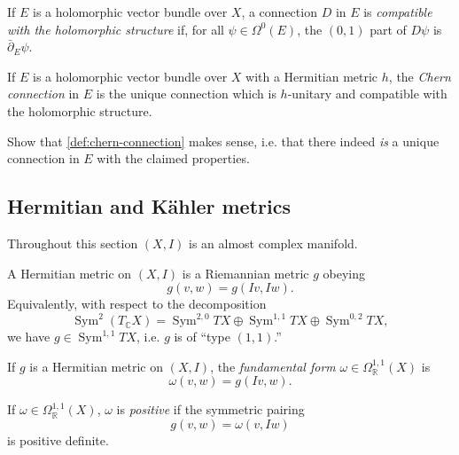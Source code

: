 \documentclass[12pt,letterpaper,reqno]{article}
\numberwithin{equation}{section}
\newcommand{\R}{\ensuremath{\mathbb R}}
\newcommand{\C}{\ensuremath{\mathbb C}}
\newcommand{\kahler}{K\"ahler\xspace}
\newcommand{\ti}[1]{\textit{#1}}
\DeclareMathOperator{\Sym}{Sym}
\begin{document}
\begin{defn}
If $E$ is a holomorphic vector bundle over $X$,
a connection $D$ in $E$ is \ti{compatible with the
holomorphic structure} if, for all 
$\psi \in \Omega^0(E)$, the $(0,1)$ part of $D \psi$ 
is $\bar\partial_E \psi$.
\end{defn}

\begin{defn} \label{def:chern-connection}
If $E$ is a holomorphic vector bundle over $X$ with
a Hermitian metric $h$, the \ti{Chern connection} 
in $E$ is the unique connection which is 
$h$-unitary and compatible with the holomorphic
structure.
\end{defn}

\begin{exercise} Show that \autoref{def:chern-connection} makes
sense, i.e. that there indeed \ti{is} a unique
connection in $E$ with the claimed properties.
\end{exercise}

\subsection{Hermitian and \kahler metrics}
Throughout this section $(X,I)$ is an almost complex manifold.

\begin{defn} A Hermitian metric on 
$(X,I)$ is a Riemannian metric $g$ obeying
$$ g(v,w) = g(Iv,Iw). $$
Equivalently, with respect to the decomposition 
\begin{equation}
  \Sym^2 (T_\C X) = \Sym^{2,0} TX \oplus \Sym^{1,1} TX \oplus \Sym^{0,2} TX,
\end{equation}
we have $g \in \Sym^{1,1} TX$, i.e. $g$ is of ``type $(1,1)$.''
\end{defn}

\begin{defn} If $g$ is a Hermitian metric on $(X,I)$, 
the \ti{fundamental form} $\omega \in \Omega^{1,1}_\R(X)$
is
\begin{equation}
  \omega(v,w) = g(Iv,w).
\end{equation}
\end{defn}

\begin{defn} If $\omega \in \Omega^{1,1}_\R(X)$,
$\omega$ is \ti{positive} if the symmetric pairing
\begin{equation}
   g(v,w) = \omega(v,Iw)
\end{equation} 
is positive definite.
\end{defn}
\end{document}
